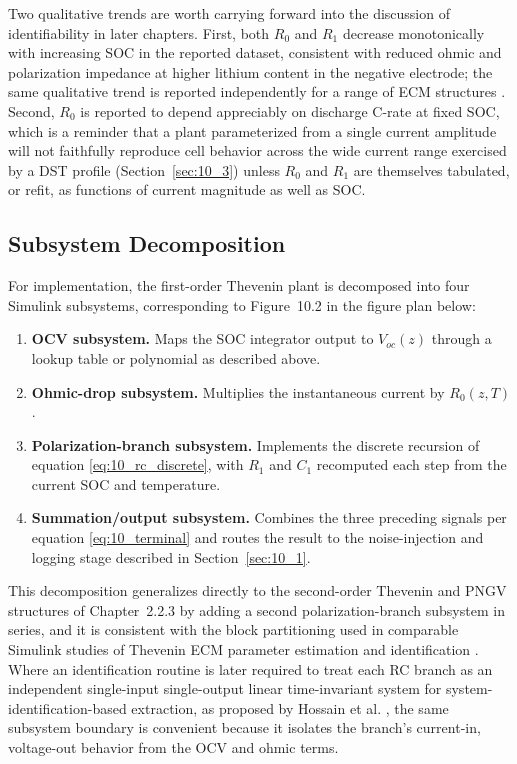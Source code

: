 Two qualitative trends are worth carrying forward into the discussion
of identifiability in later chapters. First, both $R_0$ and $R_1$
decrease monotonically with increasing SOC in the reported dataset,
consistent with reduced ohmic and polarization impedance at higher
lithium content in the negative electrode; the same qualitative trend
is reported independently for a range of ECM structures
\cite{yuan2022_ocv_tau}. Second, $R_0$ is reported to depend
appreciably on discharge C-rate at fixed SOC, which is a reminder that
a plant parameterized from a single current amplitude will not
faithfully reproduce cell behavior across the wide current range
exercised by a DST profile (Section~\ref{sec:10_3}) unless $R_0$ and
$R_1$ are themselves tabulated, or refit, as functions of current
magnitude as well as SOC.

\subsection{Subsystem Decomposition}

For implementation, the first-order Thevenin plant is decomposed into
four Simulink subsystems, corresponding to Figure~10.2 in the figure
plan below:

\begin{enumerate}
    \item \textbf{OCV subsystem.} Maps the SOC integrator output to
    $V_{oc}(z)$ through a lookup table or polynomial as described
    above.
    \item \textbf{Ohmic-drop subsystem.} Multiplies the instantaneous
    current by $R_0(z, T)$.
    \item \textbf{Polarization-branch subsystem.} Implements the
    discrete recursion of equation \eqref{eq:10_rc_discrete}, with
    $R_1$ and $C_1$ recomputed each step from the current SOC and
    temperature.
    \item \textbf{Summation/output subsystem.} Combines the three
    preceding signals per equation \eqref{eq:10_terminal} and routes
    the result to the noise-injection and logging stage described in
    Section~\ref{sec:10_1}.
\end{enumerate}

This decomposition generalizes directly to the second-order Thevenin
and PNGV structures of Chapter~2.2.3 by adding a second
polarization-branch subsystem in series, and it is consistent with
the block partitioning used in comparable Simulink studies of
Thevenin ECM parameter estimation and identification
\cite{barletta2022,daowd2010,hossain2019}. Where an identification
routine is later required to treat each RC branch as an independent
single-input single-output linear time-invariant system for
system-identification-based extraction, as proposed by Hossain et al.
\cite{hossain2019}, the same subsystem boundary is convenient because
it isolates the branch's current-in, voltage-out behavior from the
OCV and ohmic terms.

